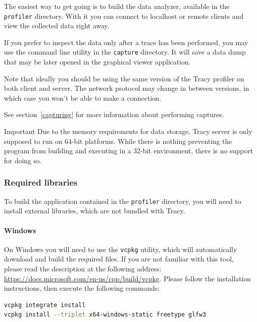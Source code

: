 \documentclass[hidelinks,titlepage,a4paper]{article}
\begin{document}
The easiest way to get going is to build the data analyzer, available in the \texttt{profiler} directory. With it you can connect to localhost or remote clients and view the collected data right away.

If you prefer to inspect the data only after a trace has been performed, you may use the command line utility in the \texttt{capture} directory. It will save a data dump that may be later opened in the graphical viewer application.

Note that ideally you should be using the same version of the Tracy profiler on both client and server. The network protocol may change in between versions, in which case you won't be able to make a connection.

See section~\ref{capturing} for more information about performing captures.

\begin{bclogo}[
noborder=true,
couleur=black!5,
logo=\bcbombe
]{Important}
Due to the memory requirements for data storage, Tracy server is only supposed to run on 64-bit platforms. While there is nothing preventing the program from building and executing in a 32-bit environment, there is no support for doing so.
\end{bclogo}

\subsubsection{Required libraries}

To build the application contained in the \texttt{profiler} directory, you will need to install external libraries, which are not bundled with Tracy.

\paragraph{Windows}

On Windows you will need to use the \texttt{vcpkg} utility, which will automatically download and build the required files. If you are not familiar with this tool, please read the description at the following address: \url{https://docs.microsoft.com/en-us/cpp/build/vcpkg}. Please follow the installation instructions, then execute the following commands:

\begin{lstlisting}[language=sh]
vcpkg integrate install
vcpkg install --triplet x64-windows-static freetype glfw3
\end{lstlisting}
\end{document}
